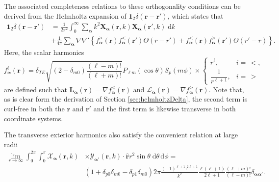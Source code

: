 \documentclass{article}
\begin{document}
The associated completeness relations to these orthogonality conditions can be derived from the Helmholtz expansion of $\bm{1}_2\delta(\mathbf{r} - \mathbf{r}')$, which states that 
\begin{equation}\label{eq:vectorSphericalHarmonicCompleteness}
\begin{split}
\bm{1}_2\delta(\mathbf{r} - \mathbf{r}') &= \frac{1}{2\pi^2}\int_0^\infty\sum_{\bm{\alpha}}k^2\mathbf{X}_{\bm{\alpha}}(\mathbf{r},k)\mathbf{X}_{\bm{\alpha}}(\mathbf{r}',k)\;\mathrm{d}k\\
&+ \frac{1}{4\pi}\sum_{\bm{\alpha}}\nabla\nabla'\left\{ f_{\bm{\alpha}}^>(\mathbf{r})f_{\bm{\alpha}}^<(\mathbf{r}')\Theta(r - r') +  f_{\bm{\alpha}}^<(\mathbf{r})f_{\bm{\alpha}}^>(\mathbf{r}')\Theta(r' - r)\right\}.
\end{split}
\end{equation}
Here, the scalar harmonics 
\begin{equation}\label{eq:scalarHarmonics}
f_{\bm{\alpha}}^i(\mathbf{r}) = \delta_{TE}\sqrt{(2 - \delta_{m0})\frac{(\ell - m)!}{(\ell + m)!}}P_{\ell m}(\cos\theta)S_p(m\phi)\times
\begin{cases}
r^\ell, & i = \, <,\\
\dfrac{1}{r^{\ell + 1}}, & i = \,>
\end{cases}
\end{equation}
are defined such that $\mathbf{L}_{\bm{\alpha}}(\mathbf{r}) = \nabla f_{\bm{\alpha}}^<(\mathbf{r})$ and $\bm{\mathcal{L}}_{\bm{\alpha}}(\mathbf{r}) = \nabla f_{\bm{\alpha}}^>(\mathbf{r})$.
Note that, as is clear form the derivation of Section \ref{sec:helmholtzDelta}, the second term is curl-free in both the $\mathbf{r}$ and $\mathbf{r}'$ and the first term is likewise transverse in both coordinate systems.

The transverse exterior harmonics also satisfy the convenient relation at large radii
\begin{equation}
\begin{split}
\lim_{r\to\infty}\int_0^{2\pi}\int_0^\pi \bm{\mathcal{X}}_{\bm{\alpha}}(\mathbf{r},k)&\times\bm{\mathcal{Y}}_{\bm{\alpha}'}(\mathbf{r},k)\cdot\hat{\mathbf{r}}r^2\sin\theta\;\mathrm{d}\theta\,\mathrm{d}\phi = \\
&(1 + \delta_{p0}\delta_{m0} - \delta_{p1}\delta_{m0})2\pi\frac{(-1)^{\ell + 1}\mathrm{i}^{2\ell + 1}}{k^2}\frac{\ell(\ell + 1)}{2\ell + 1}\frac{(\ell + m)!}{(\ell - m)!}\delta_{\bm{\alpha}\bm{\alpha}'}.
\end{split}
\end{equation}
\end{document}
